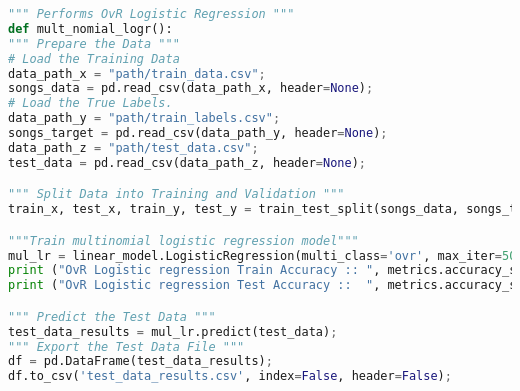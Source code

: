 \documentclass[journal]{IEEEtran}
\begin{document}
\begin{lstlisting}[language=Python, caption = OvR LogisticRegression]
""" Performs OvR Logistic Regression """
def mult_nomial_logr():
""" Prepare the Data """
# Load the Training Data
data_path_x = "path/train_data.csv";
songs_data = pd.read_csv(data_path_x, header=None);
# Load the True Labels.
data_path_y = "path/train_labels.csv";
songs_target = pd.read_csv(data_path_y, header=None);
data_path_z = "path/test_data.csv";
test_data = pd.read_csv(data_path_z, header=None);

""" Split Data into Training and Validation """
train_x, test_x, train_y, test_y = train_test_split(songs_data, songs_target, train_size=0.7, random_state=0);

"""Train multinomial logistic regression model"""
mul_lr = linear_model.LogisticRegression(multi_class='ovr', max_iter=500, solver='netwon-cg').fit(train_x, train_y);
print ("OvR Logistic regression Train Accuracy :: ", metrics.accuracy_score(train_y, mul_lr.predict(train_x)));
print ("OvR Logistic regression Test Accuracy ::  ", metrics.accuracy_score(test_y, mul_lr.predict(test_x)));

""" Predict the Test Data """
test_data_results = mul_lr.predict(test_data);
""" Export the Test Data File """
df = pd.DataFrame(test_data_results);
df.to_csv('test_data_results.csv', index=False, header=False);
\end{lstlisting}
\end{document}
